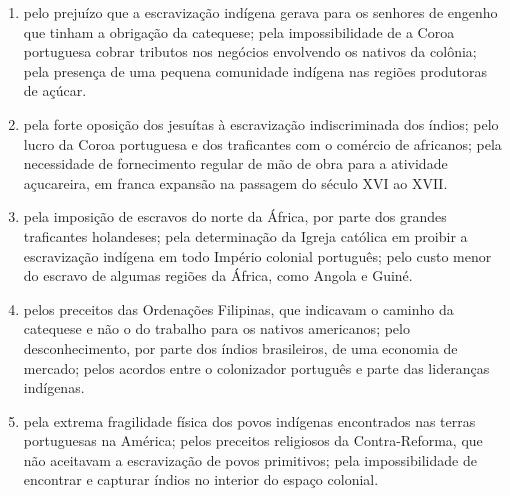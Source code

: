 \documentclass[10pt,a4paper]{article}
\begin{document}
\begin{multicols}{2}
\begin{enumerate}
		\begin{enumerate}
		\item pelo preju\'izo que a escraviza\c{c}\~ao ind\'igena gerava para os senhores de engenho que tinham a obriga\c{c}\~ao da catequese; pela impossibilidade de a Coroa portuguesa cobrar tributos nos neg\'ocios envolvendo os nativos da col\^onia; pela presen\c{c}a de uma pequena comunidade ind\'igena nas regi\~oes produtoras de a\c{c}\'ucar.
		\item pela forte oposi\c{c}\~ao dos jesu\'itas \`a escraviza\c{c}\~ao indiscriminada dos \'indios; pelo lucro da Coroa portuguesa e dos traficantes com o com\'ercio de africanos; pela necessidade de fornecimento regular de m\~ao de obra para a atividade a\c{c}ucareira, em franca expans\~ao na passagem do s\'eculo XVI ao XVII.   
		\item pela imposi\c{c}\~ao de escravos do norte da \'Africa, por parte dos grandes traficantes holandeses; pela determina\c{c}\~ao da Igreja cat\'olica em proibir a escraviza\c{c}\~ao ind\'igena em todo Imp\'erio colonial portugu\^es; pelo custo menor do escravo de algumas regi\~oes da \'Africa, como Angola e Guin\'e.
		\item pelos preceitos das Ordena\c{c}\~oes Filipinas, que indicavam o caminho da catequese e n\~ao o do trabalho para os nativos americanos; pelo desconhecimento, por parte dos \'indios brasileiros, de uma economia de mercado; pelos acordos entre o colonizador portugu\^es e parte das lideran\c{c}as ind\'igenas.
		\item pela extrema fragilidade f\'isica dos povos ind\'igenas encontrados nas terras portuguesas na Am\'erica; pelos preceitos religiosos da Contra-Reforma, que n\~ao aceitavam a escraviza\c{c}\~ao de povos primitivos; pela impossibilidade de encontrar e capturar \'indios no interior do espa\c{c}o colonial. 
		\end{enumerate}


\end{enumerate}
\end{multicols}
\end{document}
